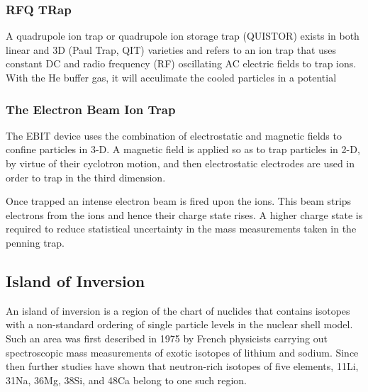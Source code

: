 \documentclass[english, 11pt]{article}
\begin{document}
\subsubsection{RFQ TRap}

A quadrupole ion trap or quadrupole ion storage trap (QUISTOR) exists in both linear and 3D (Paul Trap, QIT) varieties and refers to an ion trap that uses constant DC and radio frequency (RF) oscillating AC electric fields to trap ions.
 With the He buffer gas, it will acculimate the cooled particles in a potential

\subsubsection{The Electron Beam Ion Trap}

The EBIT device uses the combination of electrostatic and magnetic fields to confine particles in 3-D. A magnetic field is applied so as to trap particles in 2-D, by virtue of their cyclotron motion, and then electrostatic electrodes are used in order to trap in the third dimension.

Once trapped an intense electron beam is fired upon the ions. This beam strips electrons from the ions and hence their charge state rises. A higher charge state is required to reduce statistical uncertainty in the mass measurements taken in the penning trap.

\subsection{Island of Inversion}

An island of inversion is a region of the chart of nuclides that contains isotopes with a non-standard ordering of single particle levels in the nuclear shell model. Such an area was first described in 1975 by French physicists carrying out spectroscopic mass measurements of exotic isotopes of lithium and sodium. Since then further studies have shown that neutron-rich isotopes of five elements, 11Li, 31Na, 36Mg, 38Si, and 48Ca belong to one such region.

  
\end{document}

